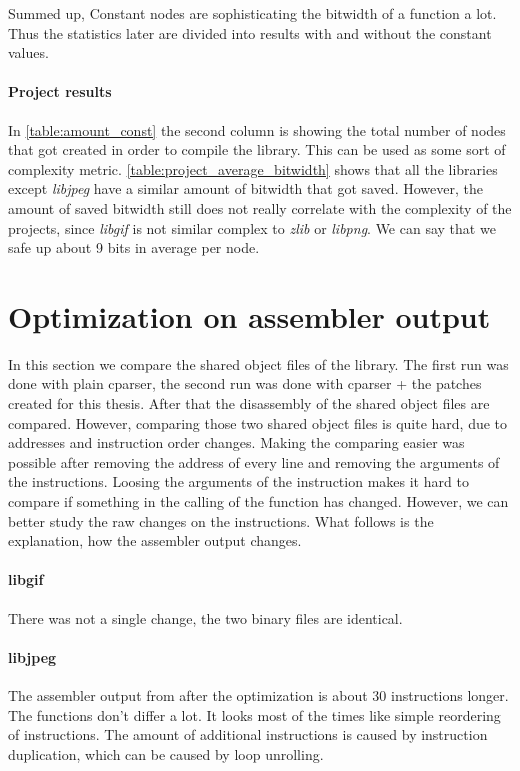 Summed up, Constant nodes are sophisticating the bitwidth of a function a lot. Thus the statistics later are divided into results with and without the constant values.

\paragraph{Project results}

In \autoref{table:amount_const} the second column is showing the total number of nodes that got created in order to compile the library. This can be used as some sort of complexity metric. 
\autoref{table:project_average_bitwidth} shows that all the libraries except \textit{libjpeg} have a similar amount of bitwidth that got saved. However, the amount of saved bitwidth still does not really correlate with the complexity of the projects, since \textit{libgif} is not similar complex to \textit{zlib} or \textit{libpng}.\newline
We can say that we safe up about 9 bits in average per node.

\section{Optimization on assembler output}

In this section we compare the shared object files of the library. The first run was done with plain cparser, the second run was done with cparser + the patches created for this thesis.\newline
After that the disassembly of the shared object files are compared. However, comparing those two shared object files is quite hard, due to addresses and instruction order changes. Making the comparing easier was possible after removing the address of every line and removing the arguments of the instructions. Loosing the arguments of the instruction makes it hard to compare if something in the calling of the function has changed. However, we can better study the raw changes on the instructions. What follows is the explanation, how the assembler output changes.

\paragraph{libgif} There was not a single change, the two binary files are identical.
\paragraph{libjpeg} The assembler output from after the optimization is about 30 instructions longer. The functions don't differ a lot. It looks most of the times like simple reordering of instructions. The amount of additional instructions is caused by instruction duplication, which can be caused by loop unrolling.

